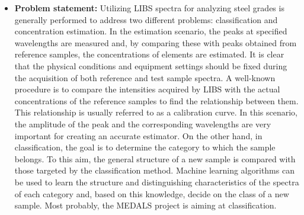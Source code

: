 \documentclass[12pt,a4paper]{article}
\begin{document}
	
	 
	 \begin{itemize}
	 	\item \textbf{Problem statement:} Utilizing LIBS spectra for analyzing steel grades is generally performed to address two different problems: classification and concentration estimation. In the estimation scenario, the peaks at specified wavelengths are measured and, by comparing these with peaks obtained from reference samples, the concentrations of elements are estimated. It is clear that the physical conditions and equipment settings should be fixed during the acquisition of both reference and test sample spectra. A well-known procedure is to compare the intensities acquired by LIBS with the actual concentrations of the reference samples to find the relationship between them. This relationship is usually referred to as a calibration curve. In this scenario, the amplitude of the peak and the corresponding wavelengths are very important for creating an accurate estimator. On the other hand, in classification, the goal is to determine the category to which the sample belongs. To this aim, the general structure of a new sample is compared with those targeted by the classification method. Machine learning algorithms can be used to learn the structure and distinguishing characteristics of the spectra of each category and, based on this knowledge, decide on the class of a new sample. Most probably, the MEDALS project is aiming at classification. 
	 	

\end{itemize}
\end{document}
